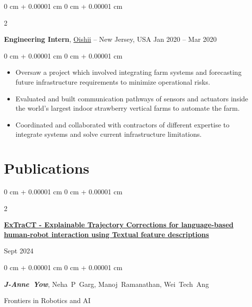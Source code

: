 \documentclass[10pt, letterpaper]{article}
\newenvironment{highlights}{
    \begin{itemize}[
        topsep=0.10 cm,
        parsep=0.10 cm,
        partopsep=0pt,
        itemsep=0pt,
        leftmargin=0 cm + 10pt
    ]
}{
    \end{itemize}
} %
\newenvironment{onecolentry}{
    \begin{adjustwidth}{
        0 cm + 0.00001 cm
    }{
        0 cm + 0.00001 cm
    }
}{
    \end{adjustwidth}
} %
\newenvironment{twocolentry}[2][]{
    \onecolentry
    \def\secondColumn{#2}
    \setcolumnwidth{\fill, 4.5 cm}
    \begin{paracol}{2}
}{
    \switchcolumn \raggedleft \secondColumn
    \end{paracol}
    \endonecolentry
} %
\begin{document}
        \begin{twocolentry}{
            Jan 2020 – Mar 2020
        }
            \textbf{Engineering Intern}, \href{https://oishii.com/}{Oishii} -- New Jersey, USA\end{twocolentry}

        \vspace{0.10 cm}
        \begin{onecolentry}
            \begin{highlights}
                \item Oversaw a project which involved integrating farm systems and forecasting future infrastructure requirements to minimize operational risks.
                \item Evaluated and built communication pathways of sensors and actuators inside the world's largest indoor strawberry vertical farms to automate the farm.
                \item Coordinated and collaborated with contractors of different expertise to integrate systems and solve current infrastructure limitations.
            \end{highlights}
        \end{onecolentry}



    
    \section{Publications}



        
        \begin{samepage}
            \begin{twocolentry}{
                Sept 2024
            }
                \textbf{\href{https://www.frontiersin.org/journals/robotics-and-ai/articles/10.3389/frobt.2024.1345693/full}{ExTraCT - Explainable Trajectory Corrections for language-based human-robot interaction using Textual feature descriptions}}
            \end{twocolentry}

            \vspace{0.10 cm}
            
            \begin{onecolentry}
                \mbox{\textbf{\textit{J-Anne Yow}}}, \mbox{Neha P Garg}, \mbox{Manoj Ramanathan}, \mbox{Wei Tech Ang}

                \vspace{0.10 cm}
                
        Frontiers in Robotics and AI\end{onecolentry}
        \end{samepage}
\end{document}
